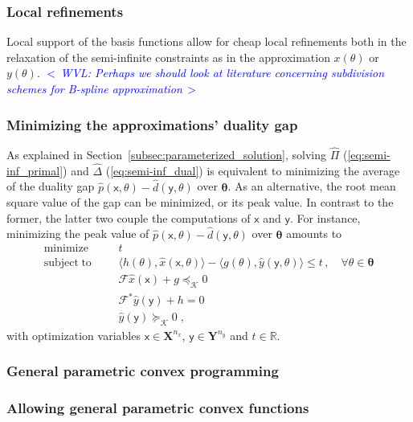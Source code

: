 \documentclass{article}
\DeclareMathOperator*{\minimize}{minimize}
\DeclareMathOperator*{\subj}{subject\;to}
\newcommand{\commentWVL}[1]{\noindent \textcolor{blue}{\emph{$<\,$WVL: #1$\,>$}}}%
\newcommand{\R}{\mathbb{R}}         %
\newcommand{\ppar}{\theta}                          %
\newcommand{\Ppar}{{\bm{\theta}}}                   %
\newcommand{\X}{\mathbf{X}}                         %
\newcommand{\Y}{\mathbf{Y}}                         %
\newcommand{\calF}{\mathcal{F}}                     %
\newcommand{\Ym}{{\bm{\mathcal{Y}}_{\Ppar}}}        %
\newcommand{\Km}{{\bm{\mathcal{K}}}}                %
\newcommand{\cx}{\textsf{x}}        %
\newcommand{\nx}{{n_x}}             %
\newcommand{\cy}{\textsf{y}}        %
\newcommand{\ny}{{n_y}}             %
\begin{document}
\subsubsection{Local refinements}
Local support of the basis functions allow for cheap local refinements both in the relaxation of the semi-infinite constraints as in the approximation $x(\ppar)$ or $y(\ppar)$.
\commentWVL{Perhaps we should look at literature concerning subdivision schemes
for B-spline approximation}


\subsubsection{Minimizing the approximations' duality gap}

As explained in Section~\ref{subsec:parameterized_solution}, solving $\hat{\Pi}$ (\ref{eq:semi-inf_primal}) and $\hat{\Delta}$ (\ref{eq:semi-inf_dual}) is equivalent to minimizing the average of the duality gap $\hat{p}(\cx,\ppar)-\hat{d}(\cy,\ppar)$ over $\Ppar$. As an alternative, the root mean square value of the gap can be minimized, or its peak value. In contrast to the former, the latter two couple the computations of $\cx$ and $\cy$. For instance, minimizing the peak value of $\hat{p}(\cx,\ppar)-\hat{d}(\cy,\ppar)$ over $\Ppar$ amounts to
\[ \begin{aligned}
\minimize &&& t \\%
\subj     &&& \langle h(\ppar) , \hat{x}(\cx,\ppar) \rangle - \langle g(\ppar) , \hat{y}(\cy,\ppar) \rangle \leq t\,,\quad\forall\ppar\in\Ppar\\ %
          &&& \calF \hat{x}(\cx) + g \preceq_\Km 0 \\%
          &&& \calF^* \hat{y}(\cy) + h = 0 \\%
          &&& \hat{y}(\cy) \succeq_\Km 0\;,%
\end{aligned}\]
with optimization variables $\cx\in\X^\nx$, $\cy\in\Y^\ny$ and $t\in\R$.

\subsubsection{General parametric convex programming}

\subsubsection{Allowing general parametric convex functions}
\end{document}
